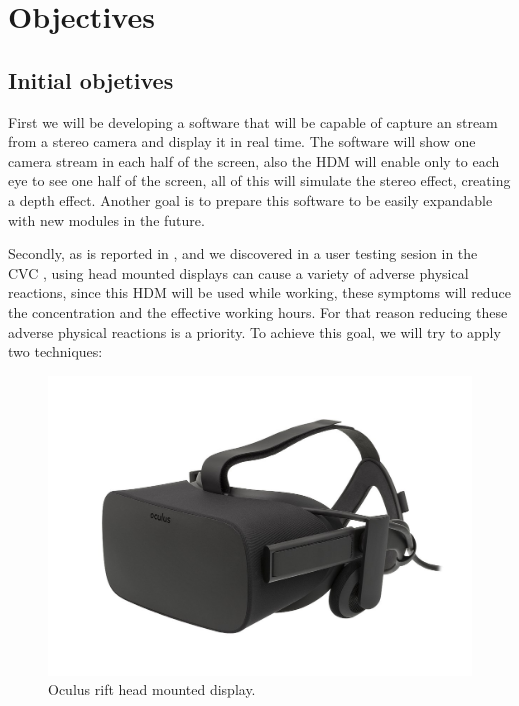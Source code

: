 \documentclass[10pt,a4paper,twocolumn,twoside]{article}
\begin{document}
	
	\section{Objectives}
	
	\subsection{Initial objetives}
	First we will be developing a software that will be capable of capture an stream from a stereo camera and display it in real time. The software will show one camera stream in each half of the screen, also the HDM will enable only to each eye to see one half of the screen, all of this will simulate the stereo effect, creating a depth effect. Another goal is to prepare this software to be easily expandable with new modules in the future.
	
	Secondly, as is reported in \cite{disconfortReview}, and we discovered in a user testing sesion in the CVC \cite{unpublishCVC}, using head mounted displays can cause a variety of adverse physical reactions, since this HDM will be used while working, these symptoms will reduce the concentration and the effective working hours. For that reason reducing these adverse physical reactions is a priority. To achieve this goal, we will try to apply two techniques: 
	
	\begin{figure}
		\centering
		\includegraphics[width=0.7\linewidth]{img/1200px-Oculus-Rift-CV1-Headset-Front}
		\caption{Oculus rift head mounted display.}
		\label{fig:oculus}
	\end{figure}
	
\end{document}
